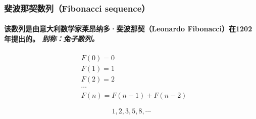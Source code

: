 \documentclass[aspectratio=3220]{ctexbeamer}
\begin{document}
\begin{frame}
\frametitle{斐波那契数列（Fibonacci sequence）}
\framesubtitle{该数列是由意大利数学家莱昂纳多·斐波那契（Leonardo Fibonacci）在1202年提出的。 \textit{别称：兔子数列。}}

\begin{definition}
\[
\begin{aligned}
&F(0)=0 \\
&F(1)=1 \\
&F(2)=2 \\
&\cdots \\
&F(n)=F(n-1)+F(n-2)
\end{aligned}
\]
\end{definition}

\begin{examples}
\[
1, 2, 3, 5, 8, \cdots
\]
\end{examples}

\end{frame}
\end{document}
